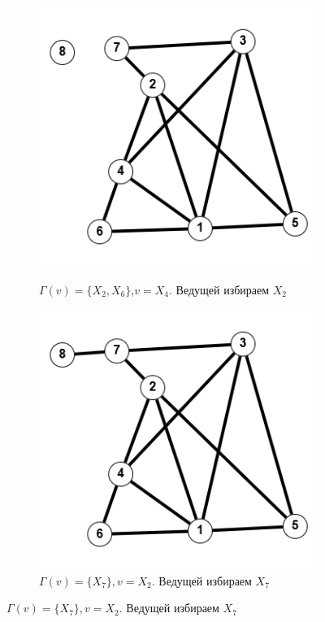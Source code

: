 \documentclass{article}
\begin{document}
\begin{enumerate}
\begin{figure}
\begin{subfigure}[b]{0.2\textwidth}
         \label{fig:3_4}
     \end{subfigure}
     \hfill
     \begin{subfigure}[b]{0.2\textwidth}
         \centering
         \caption*{\footnotesize{$\Gamma(v) = \{X_2,X_6\}$,$v = X_4$. Ведущей избираем $X_2$}}
         \includegraphics[width=\textwidth]{attachments/3/6.png}
         \label{fig:3_5}
     \end{subfigure}
     \hfill
     \begin{subfigure}[b]{0.2\textwidth}
         \centering
         \caption*{\footnotesize{$\Gamma(v) = \{X_7\}, v = X_2$. Ведущей избираем $X_7$}}
         \includegraphics[width=\textwidth]{attachments/3/7.png}

\end{subfigure}
\end{figure}
\end{enumerate}
\end{document}
